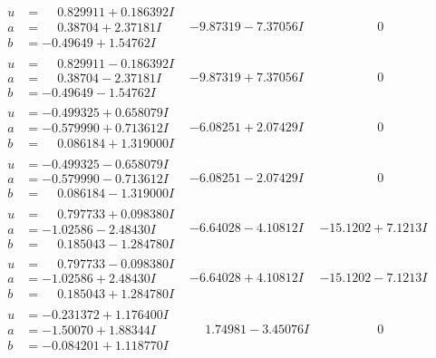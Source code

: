 \documentclass[1p]{elsarticle_modified}
\theoremstyle{definition}
\begin{document}
$$\begin{array}{c|c|c}
\begin{aligned}
u &= \phantom{-}0.829911 + 0.186392 I \\
a &= \phantom{-}0.38704 + 2.37181 I \\
b &= -0.49649 + 1.54762 I\end{aligned}
 & -9.87319 - 7.37056 I & \phantom{-0.000000 } 0 \\ \hline\begin{aligned}
u &= \phantom{-}0.829911 - 0.186392 I \\
a &= \phantom{-}0.38704 - 2.37181 I \\
b &= -0.49649 - 1.54762 I\end{aligned}
 & -9.87319 + 7.37056 I & \phantom{-0.000000 } 0 \\ \hline\begin{aligned}
u &= -0.499325 + 0.658079 I \\
a &= -0.579990 + 0.713612 I \\
b &= \phantom{-}0.086184 + 1.319000 I\end{aligned}
 & -6.08251 + 2.07429 I & \phantom{-0.000000 } 0 \\ \hline\begin{aligned}
u &= -0.499325 - 0.658079 I \\
a &= -0.579990 - 0.713612 I \\
b &= \phantom{-}0.086184 - 1.319000 I\end{aligned}
 & -6.08251 - 2.07429 I & \phantom{-0.000000 } 0 \\ \hline\begin{aligned}
u &= \phantom{-}0.797733 + 0.098380 I \\
a &= -1.02586 - 2.48430 I \\
b &= \phantom{-}0.185043 - 1.284780 I\end{aligned}
 & -6.64028 - 4.10812 I & -15.1202 + 7.1213 I \\ \hline\begin{aligned}
u &= \phantom{-}0.797733 - 0.098380 I \\
a &= -1.02586 + 2.48430 I \\
b &= \phantom{-}0.185043 + 1.284780 I\end{aligned}
 & -6.64028 + 4.10812 I & -15.1202 - 7.1213 I \\ \hline\begin{aligned}
u &= -0.231372 + 1.176400 I \\
a &= -1.50070 + 1.88344 I \\
b &= -0.084201 + 1.118770 I\end{aligned}
 & \phantom{-}1.74981 - 3.45076 I & \phantom{-0.000000 } 0 \\ \hline\begin{aligned}

\end{aligned}
\end{array}$$
\end{document}
